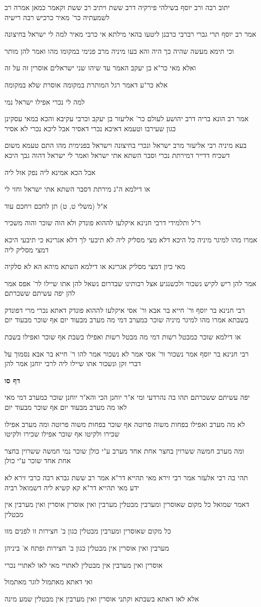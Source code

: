 \documentclass[12pt, openany]{book}
\newcommand{\sethebfont}{
\fontsize{10.5pt}{21.0pt} \selectfont
}
\newcommand{\textblock}[1]{
{\sethebfont #1\\}	
}
\newcommand{\sectname}{}
\newcommand{\newsection}[1]{
	\addcontentsline{toc}{section}{#1}
	\renewcommand{\sectname}{#1}	
	\vspace{-\baselineskip}
	\begin{center}
		\textbf{%
\fontsize{16pt}{16pt}\selectfont
			#1}
	\end{center}
	\vspace{-\baselineskip}
	\nopagebreak
}
\begin{document}
\textblock{יתוב רבה ורב יוסף בשילהי פירקיה דרב ששת ויתיב רב ששת וקאמר כמאן אמרה רב לשמעתיה כר' מאיר כרכיש רבה רישיה}
\textblock{אמר רב יוסף תרי גברי רברבי כרבנן ליטעו בהאי מילתא אי כרבי מאיר למה לי ישראל בחיצונה}
\textblock{וכי תימא מעשה שהיה כך היה והא בעו מיניה מרב פנימי במקומו מהו ואמר להן מותר}
\textblock{ואלא מאי כר"א בן יעקב האמר עד שיהו שני ישראלים אוסרין זה על זה}
\textblock{אלא כר"ע דאמר רגל המותרת במקומה אוסרת שלא במקומה}
\textblock{למה לי נכרי אפילו ישראל נמי}
\textblock{אמר רב הונא בריה דרב יהושע לעולם כר' אליעזר בן יעקב וכרבי עקיבא והכא במאי עסקינן כגון שעירבו וטעמא דאיכא נכרי דאסיר אבל ליכא נכרי לא אסיר}
\textblock{בעא מיניה רבי אליעזר מרב ישראל ונכרי בחיצונה וישראל בפנימית מהו התם טעמא משום דשכיח דדייר דמירתת נכרי וסבר השתא אתי ישראל ואמר לי ישראל דהוה גבך היכא}
\textblock{אבל הכא אמינא ליה נפק אזל ליה}
\textblock{או דילמא ה"נ מירתת דסבר השתא אתי ישראל וחזי לי}
\textblock{א"ל (משלי ט, ט) תן לחכם ויחכם עוד}
\textblock{ר"ל ותלמידי דרבי חנינא איקלעו לההוא פונדק ולא הוה שוכר והוה משכיר}
\textblock{אמרו מהו למיגר מיניה כל היכא דלא מצי מסליק ליה לא תיבעי לך דלא אגרינא כי תיבעי היכא דמצי מסליק ליה}
\textblock{מאי כיון דמצי מסליק אגרינא או דילמא השתא מיהא הא לא סלקיה}
\textblock{אמר להן ריש לקיש נשכור ולכשנגיע אצל רבותינו שבדרום נשאל להן אתו שיילו לר' אפס אמר להן יפה עשיתם ששכרתם}
\textblock{רבי חנינא בר יוסף ור' חייא בר אבא ור' אסי איקלעו לההוא פונדק דאתא נכרי מרי דפונדק בשבתא אמרו מהו למיגר מיניה שוכר כמערב דמי מה מערב מבעוד יום אף שוכר מבעוד יום}
\textblock{או דילמא שוכר כמבטל רשות דמי מה מבטל רשות ואפילו בשבת אף שוכר ואפילו בשבת}
\textblock{רבי חנינא בר יוסף אמר נשכור ור' אסי אמר לא נשכור אמר להו ר' חייא בר אבא נסמוך על דברי זקן ונשכור אתו שיילו ליה לרבי יוחנן אמר להן}
\newsection{דף סו}
\textblock{יפה עשיתם ששכרתם תהו בה נהרדעי ומי א"ר יוחנן הכי והא"ר יוחנן שוכר כמערב דמי מאי לאו מה מערב מבעוד יום אף שוכר מבעוד יום}
\textblock{לא מה מערב ואפילו בפחות משוה פרוטה אף שוכר בפחות משוה פרוטה ומה מערב אפילו שכירו ולקיטו אף שוכר אפילו שכירו ולקיטו}
\textblock{ומה מערב חמשה ששרוין בחצר אחת אחד מערב ע"י כולן שוכר נמי חמשה ששרוין בחצר אחת אחד שוכר ע"י כולן}
\textblock{תהי בה רבי אלעזר אמר רבי זירא מאי תהייא דר"א אמר רב ששת גברא רבה כרבי זירא לא ידע מאי תהייא דר"א קא קשיא ליה דשמואל רביה}
\textblock{דאמר שמואל כל מקום שאוסרין ומערבין מבטלין מערבין ואין אוסרין אוסרין ואין מערבין אין מבטלין}
\textblock{כל מקום שאוסרין ומערבין מבטלין כגון ב' חצירות זו לפנים מזו}
\textblock{מערבין ואין אוסרין אין מבטלין כגון ב' חצירות ופתח א' ביניהן}
\textblock{אוסרין ואין מערבין אין מבטלין לאתויי מאי לאו לאתויי נכרי}
\textblock{ואי דאתא מאתמול לוגר מאתמול}
\textblock{אלא לאו דאתא בשבתא וקתני אוסרין ואין מערבין אין מבטלין שמע מינה}
\end{document}
